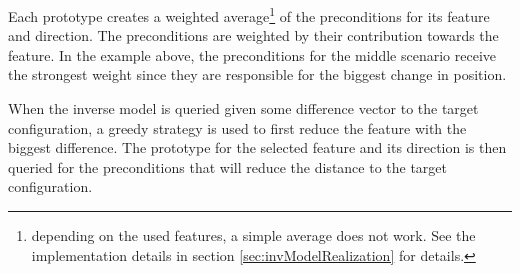 Each prototype creates a weighted average\footnote{depending on the used features, a simple average does not work. See the implementation details in section \ref{sec:invModelRealization} for details.} of the preconditions for its feature and direction. The preconditions are weighted by their contribution towards the feature. In the example above, the preconditions for the middle scenario receive the strongest weight since they are responsible for the biggest change in position. 

When the inverse model is queried given some difference vector to the target configuration, a greedy strategy is used to first reduce the feature with the biggest difference. The prototype for the selected feature and its direction is then queried for the preconditions that will reduce the distance to the target configuration. 



	
